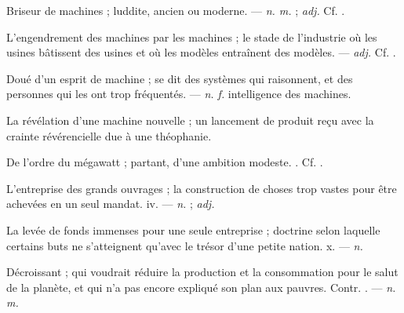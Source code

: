  Briseur de machines ; luddite, ancien ou moderne. ---  \textit{n. m.} ;  \textit{adj.} Cf. .

 L'engendrement des machines par les machines ; le stade de l'industrie où les usines bâtissent des usines et où les modèles entraînent des modèles. ---  \textit{adj.} Cf. .

 Doué d'un esprit de machine ; se dit des systèmes qui raisonnent, et des personnes qui les ont trop fréquentés. ---  \textit{n. f.} intelligence des machines.

 La révélation d'une machine nouvelle ; un lancement de produit reçu avec la crainte révérencielle due à une théophanie.  

 De l'ordre du mégawatt ; partant,  d'une ambition modeste. . Cf. .

 L'entreprise des grands ouvrages ; la construction de choses trop vastes pour être achevées en un seul mandat.   iv. ---  \textit{n.} ;  \textit{adj.}

 La levée de fonds immenses pour une seule entreprise ; doctrine selon laquelle certains buts ne s'atteignent qu'avec le trésor d'une petite nation.   x. ---  \textit{n.}

 Décroissant ; qui voudrait réduire la production et la consommation pour le salut de la planète, et qui n'a pas encore expliqué son plan aux pauvres. Contr. . ---  \textit{n. m.}

